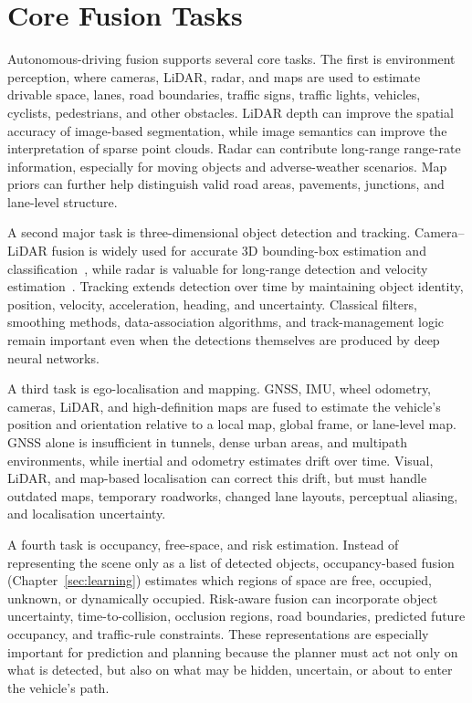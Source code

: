 \documentclass[graybox,envcountchap]{style/SNmono}
\begin{document}
\section{Core Fusion Tasks}

Autonomous-driving fusion supports several core tasks. The first is environment perception, where cameras, LiDAR, radar, and maps are used to estimate drivable space, lanes, road boundaries, traffic signs, traffic lights, vehicles, cyclists, pedestrians, and other obstacles. LiDAR depth can improve the spatial accuracy of image-based segmentation, while image semantics can improve the interpretation of sparse point clouds. Radar can contribute long-range range-rate information, especially for moving objects and adverse-weather scenarios. Map priors can further help distinguish valid road areas, pavements, junctions, and lane-level structure.

A second major task is three-dimensional object detection and tracking. Camera--LiDAR fusion is widely used for accurate 3D bounding-box estimation and classification~\cite{bai2022_transfusion,liu2023_bevfusion}, while radar is valuable for long-range detection and velocity estimation~\cite{nabati2021_centerfusion,kim2023_crn}. Tracking extends detection over time by maintaining object identity, position, velocity, acceleration, heading, and uncertainty. Classical filters, smoothing methods, data-association algorithms, and track-management logic remain important even when the detections themselves are produced by deep neural networks.

A third task is ego-localisation and mapping. GNSS, IMU, wheel odometry, cameras, LiDAR, and high-definition maps are fused to estimate the vehicle's position and orientation relative to a local map, global frame, or lane-level map. GNSS alone is insufficient in tunnels, dense urban areas, and multipath environments, while inertial and odometry estimates drift over time. Visual, LiDAR, and map-based localisation can correct this drift, but must handle outdated maps, temporary roadworks, changed lane layouts, perceptual aliasing, and localisation uncertainty.

A fourth task is occupancy, free-space, and risk estimation. Instead of representing the scene only as a list of detected objects, occupancy-based fusion (Chapter~\ref{sec:learning}) estimates which regions of space are free, occupied, unknown, or dynamically occupied. Risk-aware fusion can incorporate object uncertainty, time-to-collision, occlusion regions, road boundaries, predicted future occupancy, and traffic-rule constraints. These representations are especially important for prediction and planning because the planner must act not only on what is detected, but also on what may be hidden, uncertain, or about to enter the vehicle's path.
\end{document}
